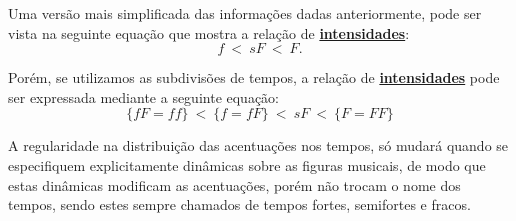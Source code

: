 Uma versão mais simplificada das informações dadas anteriormente, 
pode ser vista na seguinte equação que mostra a relação de \hyperref[sec:pos:Intensidade]{\textbf{intensidades}}:
\begin{equation}
f ~<~ sF ~<~ F.
\end{equation}

Porém, 
se utilizamos as subdivisões de tempos, 
a relação de \hyperref[sec:pos:Intensidade]{\textbf{intensidades}} pode ser expressada mediante a seguinte equação:
\begin{equation}\label{eq:acentosubdividio}
\{fF=ff\} ~<~  \{f = fF\} ~<~ sF ~<~ \{F = FF\} 
\end{equation}

\begin{tcbattention}
A regularidade na distribuição das acentuações nos tempos, 
só mudará quando se especifiquem  explicitamente dinâmicas sobre as figuras musicais,
de modo que estas dinâmicas modificam as acentuações,
porém não trocam o nome dos tempos, sendo estes sempre chamados de tempos fortes, semifortes e fracos. 
\end{tcbattention}


